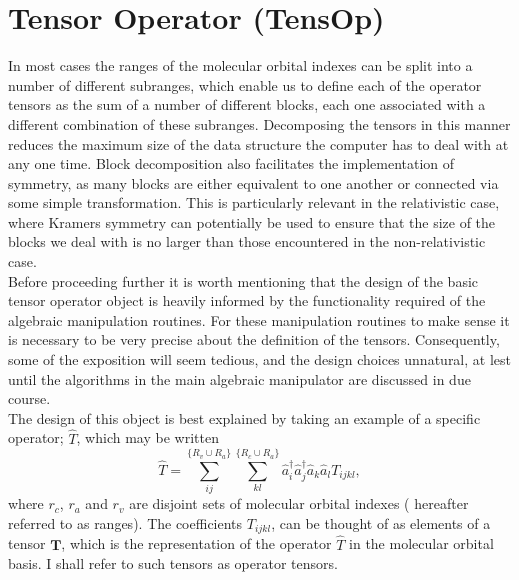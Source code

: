 \documentclass[12pt]{article}
\begin{document}
\section{Tensor Operator (TensOp)}
In most cases the ranges of the molecular orbital indexes can be split into a
number of different subranges, which enable us to define each of the operator
tensors as the sum of a number of different blocks, each one associated with a
different combination of these subranges. Decomposing the tensors in this
manner reduces the maximum size of the data structure the computer has to deal
with at any one time. Block decomposition also facilitates the implementation
of symmetry, as many blocks are either equivalent to one another or connected
via some simple transformation. This is particularly relevant in the
relativistic case, where Kramers symmetry can potentially be used to ensure
that the size of the blocks we deal with is no larger than those encountered in
the non-relativistic case.\\

\noindent Before proceeding further it is worth mentioning that the design of
the basic tensor operator object is heavily informed by the functionality
required of the algebraic manipulation routines. For these manipulation 
routines to make sense it is necessary to be very precise about the 
definition of the tensors. Consequently, some of the exposition will 
seem tedious, and the design choices unnatural, at 
lest until the algorithms in the main algebraic
manipulator are discussed in due course.\\ 

\noindent The design of this object is best explained by taking an example of a
specific operator; $\hat{T}$, which may be written
\begin{equation}
\hat{T} =  \sum_{ij}^{\{R_{v} \cup R_{a}\}}\sum_{kl}^{\{R_{c}\cup R_{a}\}} \hat{a}^{\dagger}_{i} \hat{a}^{\dagger}_{j} \hat{a}_{k} \hat{a}_{l} T_{ijkl},
\label{eqn:T_def}
\end{equation}
\noindent where $r_{c}$, $r_{a}$ and $r_{v}$ are disjoint sets of molecular
orbital indexes ( hereafter referred to as ranges).  The coefficients
$T_{ijkl}$, can be thought of as elements of a tensor $\mathbf{T}$, which is
the representation of the operator $\hat{T}$ in the molecular orbital basis.
I shall refer to such tensors as operator tensors. \\
\end{document}
